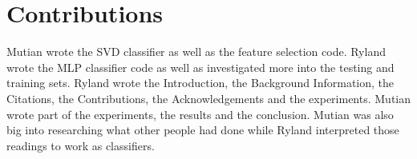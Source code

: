 
\section{Contributions}
\label{sec:contrib}

Mutian wrote the SVD classifier as well as the feature selection
code. Ryland wrote the MLP classifier code as well as investigated
more into the testing and training sets. Ryland wrote the
Introduction, the Background Information, the Citations, the
Contributions, the Acknowledgements and the experiments. Mutian wrote part of the experiments, the results and the conclusion. Mutian was
also big into researching what other people had done while Ryland
interpreted those readings to work as classifiers.